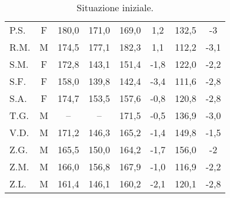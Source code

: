 \begin{table}[!h]
\begin{center}
\begin{tabular}{lccccccc}
P.S.	& F & 180,0 & 171,0 & 169,0 & 1,2  	  		& 132,5 & -3    \\
R.M.	& M & 174,5 & 177,1 & 182,3 & 1,1    			& 112,2 & -3,1  \\
S.M.	& F & 172,8 & 143,1 & 151,4 & -1,8 	        	& 122,0 & -2,2  \\
S.F.	& F & 158,0 & 139,8 & 142,4 & -3,4 	  		& 111,6 & -2,8  \\
S.A.	& F & 174,7 & 153,5 & 157,6 & -0,8 	  		& 120,8 & -2,8  \\
T.G.    & M & --    & --    & 171,5 & -0,5    			& 136,9 & -3,0  \\
V.D.	& M & 171,2 & 146,3 & 165,2 & -1,4 	  		& 149,8 & -1,5  \\
Z.G.	& M & 165,5 & 150,0 & 164,2 & -1,7 	  		& 156,0 & -2     \\
Z.M.	& M & 166,0 & 156,8 & 167,9 & -1,0 	  		& 116,9 & -2,2  \\
Z.L.	& M & 161,4 & 146,1 & 160,2 & -2,1 	  		& 120,1 & -2,8  \\
\bottomrule
\end{tabular}
\end{center}
\caption{Situazione iniziale.}
\label{tab:SituazioneIniziale}
\end{table}



